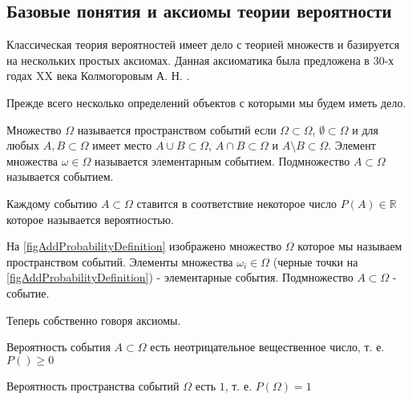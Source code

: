 \subsection{Базовые понятия и аксиомы теории вероятности}

Классическая теория вероятностей имеет дело с теорией множеств и
базируется на нескольких простых аксиомах. Данная аксиоматика была
предложена в 30-х годах XX века Колмогоровым
А. Н. \cite{bKolmogorov74basic}. 

Прежде всего несколько определений объектов с которыми мы будем иметь
дело. 

\begin{definition}
\label{def:events_set}
  Множество $\Omega$ называется пространством событий если
  $\Omega \subset \Omega$, $\emptyset \subset \Omega$ и для любых
  $A,B \subset \Omega$ имеет место
  $A \cup B \subset \Omega$, $A \cap B \subset \Omega$ и
  $A \setminus B \subset \Omega$.  Элемент множества
  $\omega \in \Omega$ называется элементарным событием. Подмножество 
  $A \subset \Omega$ называется событием.
\end{definition}

\begin{definition}
  Каждому событию $A \subset \Omega$ ставится в соответствие некоторое
  число $P\left(A\right) \in \mathbb{R}$ которое называется вероятностью.
\end{definition}

\begin{example}

На \autoref{figAddProbabilityDefinition} изображено множество
$\Omega$ которое мы называем пространством событий. Элементы
множества $\omega_i \in \Omega$ (черные точки на
\autoref{figAddProbabilityDefinition}) - элементарные
события. Подмножество $A \subset \Omega$ - событие.
\end{example}

Теперь собственно говоря аксиомы.

\begin{axiom}[Не-отрицательность]
  \label{axProbabilityKolmogorovNonNegativity}
  Вероятность события $A \subset \Omega$ есть неотрицательное
  вещественное число, т. е. $P\left(\right) \ge 0$
\end{axiom}

\begin{axiom}[Нормировка]
  \label{ax:ProbabilityNormalization}
  Вероятность пространства событий $\Omega$ есть $1$, т. е.
  $P\left(\Omega\right) = 1$
\end{axiom}

